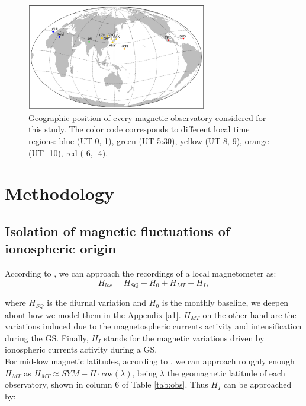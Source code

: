\documentclass[a4paper]{article}
\theoremstyle{plain}
\theoremstyle{definition}
\begin{document}
\begin{figure}
	\centering
	\includegraphics[width=0.7\textwidth]{fig/map.eps}
	\caption{Geographic position of every magnetic observatory considered for this study. The color code corresponds to different local time regions: blue (UT 0, 1), green (UT 5:30), yellow (UT 8, 9), orange (UT -10), red (-6, -4).}
	\label{fig:map}
\end{figure}


	\section{Methodology}
	\label{sec:method}
	
	
	\subsection{Isolation of magnetic fluctuations of ionospheric origin}
	According to \cite{1969intro_to_iono_p, l_handbook_geof_sw_Geom_field, baseline_Gjerloev, vanKampt}, we can approach the recordings of a local magnetometer as:
	\begin{equation}
		H_{loc} = H_{SQ} + H_0 + H_{MT} + H_{I},
	\end{equation}
	
	\noindent where $H_{SQ}$ is the diurnal variation and $H_0$ is the monthly baseline, we deepen about how we model them in the Appendix \ref{a1}. $H_{MT}$ on the other hand are the variations induced due to the magnetospheric currents activity and intensification during the GS. Finally, $H_I$ stands for the magnetic variations driven by ionospheric currents activity during a GS.\\
	
	For mid-low magnetic latitudes, according to \cite{amory2020_filtros}, we can approach roughly enough $H_{MT}$ as $H_{MT} \approx SYM - H \cdot cos(\lambda)$, being $\lambda$ the geomagnetic latitude of each observatory, shown in column 6 of Table \ref{tab:obs}. Thus $H_I$ can be approached by:
	
\end{document}
